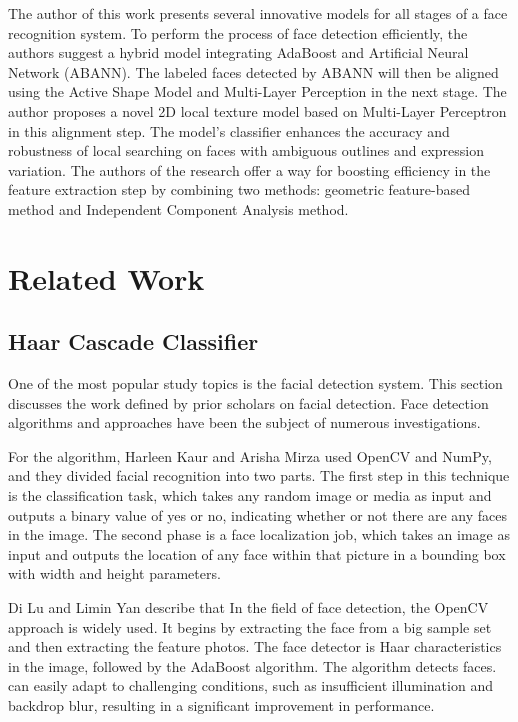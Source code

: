 \documentclass[journal]{IEEEtran}
\begin{document}
The author of this work presents several innovative models for
all stages of a face recognition system. To perform the process
of face detection efficiently, the authors suggest a hybrid
model integrating AdaBoost and Artificial Neural Network (ABANN).
The labeled faces detected by ABANN will then be aligned using
the Active Shape Model and Multi-Layer Perception in the next
stage. The author proposes a novel 2D local texture model based
on Multi-Layer Perceptron in this alignment step. The model's
classifier enhances the accuracy and robustness of local
searching on faces with ambiguous outlines and expression
variation. The authors of the research offer a way for boosting
efficiency in the feature extraction step by combining two
methods: geometric feature-based method and Independent
Component Analysis method.\cite{[14]}

\section{Related Work}
\subsection{Haar Cascade Classifier}
One of the most popular study topics is the facial detection
system. This section discusses the work defined by prior
scholars on facial detection. Face detection algorithms and
approaches have been the subject of numerous investigations.

For the algorithm, Harleen Kaur and Arisha Mirza used OpenCV
and NumPy, and they divided facial recognition into two parts.
The first step in this technique is the classification task,
which takes any random image or media as input and outputs a
binary value of yes or no, indicating whether or not there are
any faces in the image. The second phase is a face localization
job, which takes an image as input and outputs the location of
any face within that picture in a bounding box with width and
height parameters.\cite{kaur2021face}

Di Lu and Limin Yan describe that In the field of face detection,
the OpenCV approach is widely used. It begins by extracting the
face from a big sample set and then extracting the feature
photos. The face detector is Haar characteristics in the image,
followed by the AdaBoost algorithm. The algorithm detects
faces. can easily adapt to challenging conditions, such as
insufficient illumination and backdrop blur, resulting in a
significant improvement in performance.\cite{lu2021face}
\end{document}

